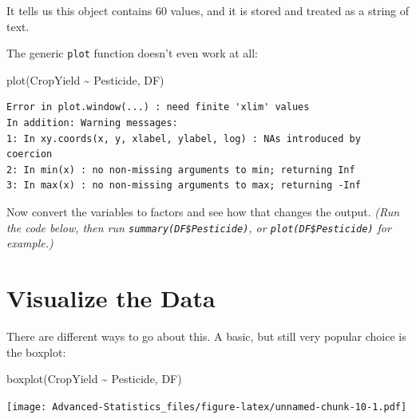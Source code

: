 \documentclass[
]{book}
\newenvironment{Shaded}{\begin{snugshade}}{\end{snugshade}}
\newcommand{\FunctionTok}[1]{\textcolor[rgb]{0.00,0.00,0.00}{#1}}
\newcommand{\NormalTok}[1]{#1}
\newcommand{\OtherTok}[1]{\textcolor[rgb]{0.56,0.35,0.01}{#1}}
\newcommand{\SpecialCharTok}[1]{\textcolor[rgb]{0.00,0.00,0.00}{#1}}
\begin{document}
It tells us this object contains 60 values, and it is stored and treated as a string of text.

The generic \texttt{plot} function doesn't even work at all:

\begin{Shaded}
\begin{Highlighting}[]
\FunctionTok{plot}\NormalTok{(CropYield }\SpecialCharTok{\textasciitilde{}}\NormalTok{ Pesticide, DF)}
\end{Highlighting}
\end{Shaded}

\begin{verbatim}
Error in plot.window(...) : need finite 'xlim' values
In addition: Warning messages:
1: In xy.coords(x, y, xlabel, ylabel, log) : NAs introduced by coercion
2: In min(x) : no non-missing arguments to min; returning Inf
3: In max(x) : no non-missing arguments to max; returning -Inf
\end{verbatim}

Now convert the variables to factors and see how that changes the output. \emph{(Run the code below, then run \texttt{summary(DF\$Pesticide)}, or \texttt{plot(DF\$Pesticide)} for example.)}

\begin{Shaded}
\end{Shaded}

\hypertarget{vis-t}{%
\section{Visualize the Data}\label{vis-t}}

There are different ways to go about this. A basic, but still very popular choice is the boxplot:

\begin{Shaded}
\begin{Highlighting}[]
\FunctionTok{boxplot}\NormalTok{(CropYield }\SpecialCharTok{\textasciitilde{}}\NormalTok{ Pesticide, DF)}
\end{Highlighting}
\end{Shaded}

\texttt{[image: Advanced-Statistics\_files/figure-latex/unnamed-chunk-10-1.pdf]}
\end{document}
